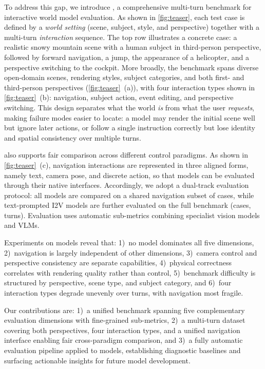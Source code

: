 To address this gap, we introduce \benchmark, a comprehensive multi-turn benchmark for interactive world model evaluation. As shown in \cref{fig:teaser}, each test case is defined by a \emph{world setting} (scene, subject, style, and perspective) together with a multi-turn \emph{interaction} sequence. The top row illustrates a concrete case: a realistic snowy mountain scene with a human subject in third-person perspective, followed by forward navigation, a jump, the appearance of a helicopter, and a perspective switching to the cockpit. More broadly, the benchmark spans diverse open-domain scenes, rendering styles, subject categories, and both first- and third-person perspectives (\cref{fig:teaser}~\!(a)), with four interaction types shown in \cref{fig:teaser}~\!(b): navigation, subject action, event editing, and perspective switching. This design separates what the world \emph{is} from what the user \emph{requests}, making failure modes easier to locate: a model may render the initial scene well but ignore later actions, or follow a single instruction correctly but lose identity and spatial consistency over multiple turns.

\benchmark also supports fair comparison across different control paradigms. As shown in \cref{fig:teaser}~\!(c), navigation interactions are represented in three aligned forms, namely text, camera pose, and discrete action, so that models can be evaluated through their native interfaces. Accordingly, we adopt a dual-track evaluation protocol: all \nummodel models are compared on a shared navigation subset of \numnavi cases, while text-prompted I2V models are further evaluated on the full benchmark (\numvideo cases, \numturn turns). Evaluation uses \numsubmetric automatic sub-metrics combining specialist vision models and VLMs.

Experiments on \nummodel models reveal that:
1)~no model dominates all five dimensions,
2)~navigation is largely independent of other dimensions,
3)~camera control and perspective consistency are separate capabilities,
4)~physical correctness correlates with rendering quality rather than control,
5)~benchmark difficulty is structured by perspective, scene type, and subject category, and
6)~four interaction types degrade unevenly over turns, with navigation most fragile.

Our contributions are: 1)~a unified benchmark spanning five complementary evaluation dimensions with \numsubmetric fine-grained sub-metrics, 2)~a multi-turn dataset covering both perspectives, four interaction types, and a unified navigation interface enabling fair cross-paradigm comparison, and 3)~a fully automatic evaluation pipeline applied to \nummodel models, establishing diagnostic baselines and surfacing actionable insights for future model development.
